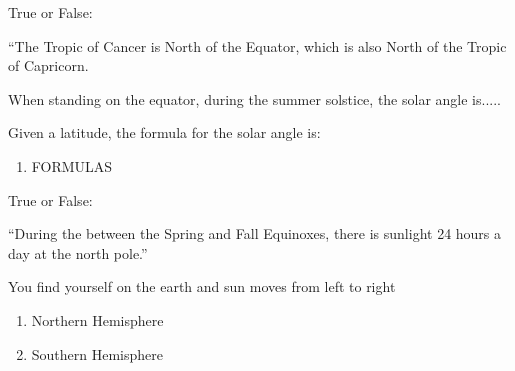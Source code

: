 \documentclass[noauthor,nooutcomes]{ximera}
\author{Bart Snapp}
\begin{document}
\maketitle


\begin{exercise}
  True or False:

  ``The Tropic of Cancer is North of the Equator, which is also North of the Tropic of Capricorn.
\end{exercise}


\begin{exercise}
  When standing on the equator, during the summer solstice, the solar angle is.....
\end{exercise}




\begin{exercise}
  Given a latitude, the formula for the solar angle is:
  \begin{enumerate}
  \item FORMULAS
  \end{enumerate}
\end{exercise}


\begin{exercise}
  True or False:

  ``During the between the Spring and Fall Equinoxes, there is sunlight 24 hours a day at the north pole.''
\end{exercise}



\begin{exercise}
  You find yourself on the earth and sun moves from left to right
  \begin{enumerate}
  \item Northern Hemisphere
  \item Southern Hemisphere
  \end{enumerate}
\end{exercise}





\end{document}
